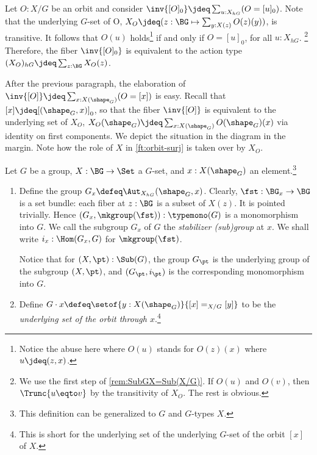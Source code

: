   Let $O:X/G$ be an orbit and consider
  $\inv{[O]_0} \jdeq \sum_{u:X_{hG}}(O=[u]_0)$. Note that the underlying $G$-set
  of O, \ie $X_O\jdeq(z:\BG \mapsto \sum_{y:X(z)}O(z)(y))$, is transitive. It
  follows that $O(u)$ holds\footnote{Notice the abuse here where $O(u)$ stands
    for $O(z)(x)$ where $u \jdeq (z,x)$.} if and only if $O=[u]_0$, for all
  $u:X_{hG}$.%
  \footnote{We use the first step of \cref{rem:SubGX=Sub(X/G)}.  If $O(u)$ and
    $O(v)$, then $\Trunc{u\eqto v}$ by the transitivity of $X_O$. The rest is
    obvious.}  Therefore, the fiber $\inv{[O]_0}$ is equivalent to the action
  type $(X_O)_{hG}\jdeq\sum_{z:\BG} X_O(z)$.

After the previous paragraph, the elaboration of 
$\inv{[O]} \jdeq \sum_{x:X(\sh_G)}(O=[x])$ is easy.
Recall that $[x]\jdeq[(\sh_G,x)]_0$, so that the fiber $\inv{[O]}$
is equivalent to the underlying set of $X_O$, \ie
$X_O(\sh_G)\jdeq\sum_{x:X(\sh_G)} O(\sh_G)(x)$
via identity on first components.
We depict the situation in the diagram%
in the margin. Note how the role of $X$ in \cref{ft:orbit-surj} 
is taken over by $X_O$. 

\begin{definition}\label{def:orbit-stabilizer}
  Let $G$ be a group, $X : \BG \to \Set$ a $G$-set, 
  and $x : X(\sh_G)$ an element.\footnote{%
  This definition can be generalized to \inftygps $G$ and $G$-types $X$.}
  \begin{enumerate}
  \item Define the group $G_x \defeq \Aut_{X_{hG}}(\sh_G,x)$.
    Clearly, $\fst:\BG_x \to \BG$ is a set bundle: each fiber at $z:\BG$ is a
    subset of $X(z)$. It is pointed trivially. Hence
    $(G_x,\mkgroup(\fst)):\typemono(G)$ is a monomorphism into $G$.  We call the
    subgroup $G_x$ of $G$ the \emph{stabilizer (sub)group}%
     at $x$. We shall write $i_x : \Hom(G_x,G)$ for
    $\mkgroup(\fst)$.

    Notice that for $(X,\pt):\Sub(G)$, the group $G_\pt$ is the underlying group
    of the subgroup $(X,\pt)$, and $(G_\pt, i_\pt)$ is the corresponding
    monomorphism into $G$.
  \item Define $G\cdot x \defeq \setof{y : X(\sh_G)}{[x] =_{X/G} [y]}$
    to be the \emph{underlying set of the orbit through $x$}.\footnote{%
    This is short for the underlying set of the underlying $G$-set of the
    orbit $[x]$ of $X$.}
    \qedhere
  \end{enumerate}
\end{definition}

